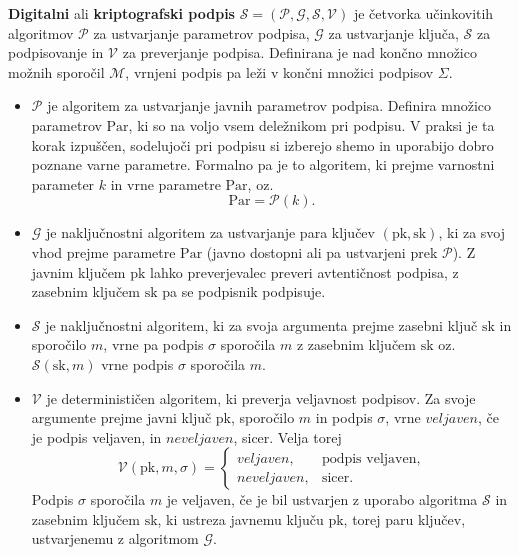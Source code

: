 \begin{definicija}
\label{def:digisig}
    \textbf{Digitalni} ali \textbf{kriptografski podpis} $\mathcal{S} = (\mathcal{P}, \mathcal{G},
    \mathcal{S}, \mathcal{V})$ je četvorka učinkovitih algoritmov $\mathcal{P}$ za ustvarjanje parametrov
    podpisa, $\mathcal{G}$ za ustvarjanje ključa, $\mathcal{S}$ za podpisovanje in $\mathcal{V}$ za
    preverjanje podpisa. Definirana je nad končno množico možnih  sporočil $\mathcal{M}$, vrnjeni
    podpis pa leži v končni množici podpisov $\Sigma$.
    \begin{itemize}
        \item $\mathcal{P}$ je algoritem za ustvarjanje javnih parametrov podpisa. Definira množico
            parametrov $\text{Par}$, ki so na voljo vsem deležnikom pri podpisu. V praksi je ta korak izpuščen,
            sodelujoči pri podpisu si izberejo shemo in uporabijo dobro poznane varne parametre.
            Formalno pa je to algoritem, ki prejme varnostni parameter $k$ in vrne parametre
            $\text{Par}$, oz.\
            $$
            \text{Par} = \mathcal{P}(k).
            $$
        \item $\mathcal{G}$ je naključnostni algoritem za ustvarjanje para ključev $(\text{pk}, \text{sk})$,
            ki za svoj vhod prejme parametre $\text{Par}$ (javno dostopni ali pa ustvarjeni prek $\mathcal{P}$).
            Z javnim ključem $\text{pk}$ lahko preverjevalec preveri avtentičnost podpisa, z zasebnim
            ključem $\text{sk}$ pa se podpisnik podpisuje.
        \item $\mathcal{S}$ je naključnostni algoritem, ki za svoja argumenta prejme zasebni ključ $\text{sk}$
            in sporočilo $m$, vrne pa podpis $\sigma$ sporočila $m$ z zasebnim ključem $\text{sk}$
            oz.\ $\mathcal{S}(\text{sk}, m)$ vrne podpis $\sigma$ sporočila $m$.
        \item $\mathcal{V}$ je determinističen algoritem, ki preverja veljavnost podpisov. Za svoje argumente
            prejme javni ključ $\text{pk}$, sporočilo $m$ in podpis $\sigma$, vrne $veljaven$, če je podpis 
            veljaven, in $neveljaven$, sicer. Velja torej
            $$ 
            \mathcal{V}(\text{pk}, m, \sigma) =
            \begin{cases}
                veljaven, & \text{podpis veljaven}, \\
                neveljaven, & \text{sicer}.
            \end{cases}
            $$
            Podpis $\sigma$ sporočila $m$ je veljaven, če je bil ustvarjen z uporabo algoritma
            $\mathcal{S}$ in zasebnim ključem $\text{sk}$, ki ustreza javnemu ključu $\text{pk}$,
            torej paru ključev, ustvarjenemu z algoritmom $\mathcal{G}$.
    \end{itemize}
\end{definicija}

